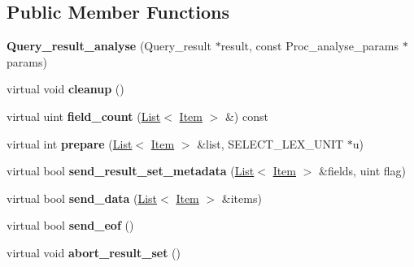 \subsection*{Public Member Functions}
\begin{DoxyCompactItemize}
\item 
\mbox{\label{classQuery__result__analyse_aa46d37b83782767c0452f4ae2eefca35}} 
{\bfseries Query\+\_\+result\+\_\+analyse} (Query\+\_\+result $\ast$result, const Proc\+\_\+analyse\+\_\+params $\ast$params)
\item 
\mbox{\label{classQuery__result__analyse_ac5889acb45551d9fd532f43f681fc264}} 
virtual void {\bfseries cleanup} ()
\item 
\mbox{\label{classQuery__result__analyse_abad959d357f336e4403dace769ae56b1}} 
virtual uint {\bfseries field\+\_\+count} (\mbox{\hyperlink{classList}{List}}$<$ \mbox{\hyperlink{classItem}{Item}} $>$ \&) const
\item 
\mbox{\label{classQuery__result__analyse_a18b5adccd850503612ed986e305a311d}} 
virtual int {\bfseries prepare} (\mbox{\hyperlink{classList}{List}}$<$ \mbox{\hyperlink{classItem}{Item}} $>$ \&list, S\+E\+L\+E\+C\+T\+\_\+\+L\+E\+X\+\_\+\+U\+N\+IT $\ast$u)
\item 
\mbox{\label{classQuery__result__analyse_a06932228dbda6909fb650c94a1a5e660}} 
virtual bool {\bfseries send\+\_\+result\+\_\+set\+\_\+metadata} (\mbox{\hyperlink{classList}{List}}$<$ \mbox{\hyperlink{classItem}{Item}} $>$ \&fields, uint flag)
\item 
\mbox{\label{classQuery__result__analyse_aa4a46f17462d0d208fa9686b0ca5d769}} 
virtual bool {\bfseries send\+\_\+data} (\mbox{\hyperlink{classList}{List}}$<$ \mbox{\hyperlink{classItem}{Item}} $>$ \&items)
\item 
\mbox{\label{classQuery__result__analyse_ae1f07c619d3ed26a73ba682f7cd3c6a0}} 
virtual bool {\bfseries send\+\_\+eof} ()
\item 
\mbox{\label{classQuery__result__analyse_acb341a0db339fb141664d7f31c6dbe2b}} 
virtual void {\bfseries abort\+\_\+result\+\_\+set} ()
\end{DoxyCompactItemize}
